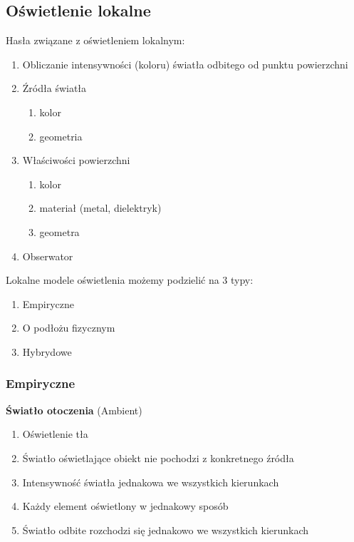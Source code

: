 \documentclass[12pt]{article}
\begin{document}
\subsection{Oświetlenie lokalne}
Hasła związane z oświetleniem lokalnym:

\begin{enumerate}
\item Obliczanie intensywności (koloru) światła odbitego od punktu powierzchni
\item Źródła światła
\begin{enumerate}
\item kolor
\item geometria
\end{enumerate}

\item Właściwości powierzchni
\begin{enumerate}
\item kolor
\item materiał (metal, dielektryk)
\item geometra
\end{enumerate}

\item Obserwator
\end{enumerate}

Lokalne modele oświetlenia możemy podzielić na 3 typy:
\begin{enumerate}
\item Empiryczne
\item O podłożu fizycznym
\item Hybrydowe
\end{enumerate}

\subsubsection{Empiryczne}

\textbf{Światło otoczenia} (Ambient)
\begin{enumerate}
\item Oświetlenie tła
\item Światło oświetlające obiekt nie pochodzi z konkretnego źródła
\item Intensywność światła jednakowa we wszystkich kierunkach
\item Każdy element oświetlony w jednakowy sposób
\item Światło odbite rozchodzi się jednakowo we wszystkich kierunkach
\end{enumerate}
\end{document}
